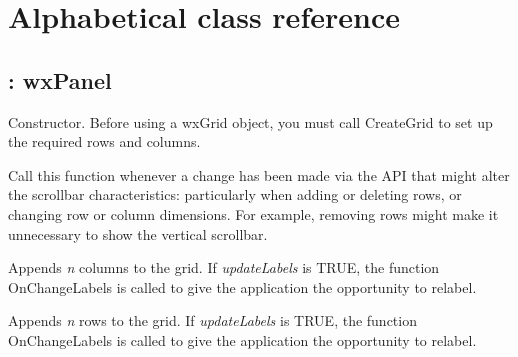 \chapter{Alphabetical class reference}\label{classref}
%
\setfooter{\thepage}{}{}{}{}{\thepage}%



\section{: wxPanel}\label{wxgrid}




Constructor. Before using a wxGrid object, you must call CreateGrid to set up the required rows and columns.



Call this function whenever a change has been made via the API that might alter the scrollbar characteristics:
particularly when adding or deleting rows, or changing row or column dimensions. For example,
removing rows might make it unnecessary to show the vertical scrollbar.



Appends {\it n} columns to the grid. If {\it updateLabels} is TRUE,
the function OnChangeLabels is called to give the application the opportunity to relabel.



Appends {\it n} rows to the grid. If {\it updateLabels} is TRUE,
the function OnChangeLabels is called to give the application the opportunity to relabel.

\label{beginbatch}


